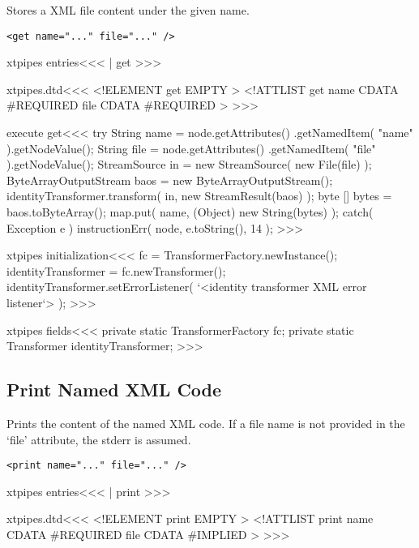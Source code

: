 \documentclass{article}
\begin{document}
{Stores a XML file content under the given name.

\begin{verbatim}
<get name="..." file="..." />
\end{verbatim}


\<xtpipes entries\><<<
| get
>>>


\<xtpipes.dtd\><<<
<!ELEMENT get EMPTY >
<!ATTLIST get
          name CDATA #REQUIRED
          file CDATA #REQUIRED
>
>>>


\<execute get\><<<
try {
  String name = node.getAttributes()
                  .getNamedItem( "name" ).getNodeValue();
  String file = node.getAttributes()
               .getNamedItem( "file" ).getNodeValue();
  StreamSource in   = new StreamSource( new File(file) );
  ByteArrayOutputStream baos = new ByteArrayOutputStream();
  identityTransformer.transform( in, new StreamResult(baos) );
  byte [] bytes = baos.toByteArray();
  map.put( name, (Object) new String(bytes) );
} catch( Exception e ){
   instructionErr( node, e.toString(), 14 );
}
>>>



\<xtpipes initialization\><<<
fc = TransformerFactory.newInstance();
identityTransformer =  fc.newTransformer();
identityTransformer.setErrorListener(
    `<identity transformer XML error listener`> );
>>>

\<xtpipes fields\><<<
private static TransformerFactory fc;
private static Transformer identityTransformer;
>>>



\subsection{Print Named XML Code}

Prints the content of the named XML code. If a file name is not
provided in the `file' attribute,
the stderr is assumed.

\begin{verbatim}
<print name="..." file="..." />
\end{verbatim}



\<xtpipes entries\><<<
| print
>>>


\<xtpipes.dtd\><<<
<!ELEMENT print EMPTY >
<!ATTLIST print
          name CDATA #REQUIRED
          file CDATA #IMPLIED
>
>>>



}
\end{document}
